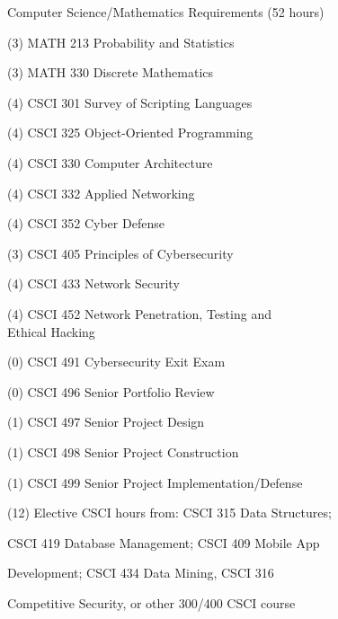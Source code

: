 \begin{reqgroup}{Computer Science/Mathematics Requirements (52 hours)}
\begin{checklist}
\begin{minipage}[t]{0.5\linewidth}
	\item (3) MATH 213 Probability and Statistics
	\item (3) MATH 330 Discrete Mathematics
	\item (4) CSCI 301 Survey of Scripting Languages
	\item (4) CSCI 325 Object-Oriented Programming
	\item (4) CSCI 330 Computer Architecture
	\item (4) CSCI 332 Applied Networking
	\item (4) CSCI 352 Cyber Defense
	\item (3) CSCI 405 Principles of Cybersecurity
	\item (4) CSCI 433 Network Security
	\item (4) CSCI 452 Network Penetration, Testing and\\Ethical Hacking
\end{minipage}
\begin{minipage}[t]{0.5\linewidth}
	\item (0) CSCI 491 Cybersecurity Exit Exam
	\item (0) CSCI 496 Senior Portfolio Review
	\item (1) CSCI 497 Senior Project Design
	\item (1) CSCI 498 Senior Project Construction
	\item (1) CSCI 499 Senior Project Implementation/Defense
	\item (12) Elective CSCI hours from: CSCI 315 Data Structures;
	\item \hspace{1em} CSCI 419 Database Management; CSCI 409 Mobile App
	\item \hspace{1em} Development; CSCI 434 Data Mining, CSCI 316
	\item[] \hspace{1em} Competitive Security, or other 300/400 CSCI course


\end{minipage}
\end{checklist}
\end{reqgroup}

